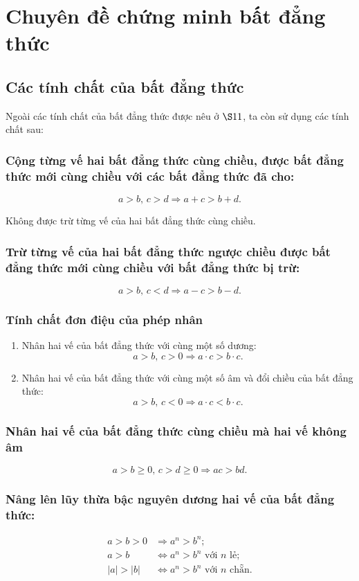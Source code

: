 \section{Chuyên đề chứng minh bất đẳng thức}
\subsection{Các tính chất của bất đẳng thức}
Ngoài các tính chất của bất đẳng thức được nêu ở $\S 11$, ta còn sử dụng các tính chất sau: 
\subsubsection{Cộng từng vế hai bất đẳng thức cùng chiều, được bất đẳng thức mới cùng chiều với các bất đẳng thức đã cho:}
$$a>b,\, c>d\Rightarrow a+c>b+d.$$
\begin{note}
Không được trừ từng vế của hai bất đẳng thức cùng chiều.
\end{note}
\subsubsection{Trừ từng vế của hai bất đẳng thức ngược chiều được bất đẳng thức mới cùng chiều với bất đẳng thức bị trừ:}
$$a>b,\, c<d\Rightarrow a-c>b-d.$$
\subsubsection{Tính chất đơn điệu của phép nhân}
\begin{enumerate}
	\item Nhân hai vế của bất đẳng thức với cùng một số dương:$$a>b,\, c>0\Rightarrow a\cdot c>b\cdot c.$$
	\item Nhân hai vế của bất đẳng thức với cùng một số âm và đổi chiều của bất đẳng thức: $$a>b,\, c<0\Rightarrow a\cdot c<b\cdot c.$$
\end{enumerate}
\subsubsection{Nhân hai vế của bất đẳng thức cùng chiều mà hai vế không âm}
$$a>b\geq 0,\, c>d\geq 0\Rightarrow ac>bd.$$
\subsubsection{Nâng lên lũy thừa bậc nguyên dương hai vế của bất đẳng thức:}
\begin{align*}
a>b>0&\Rightarrow a^n>b^n;\\
a>b&\Leftrightarrow a^n>b^n \text{ với $n$ lẻ};\\
\left|a\right|>\left|b\right|&\Leftrightarrow a^n>b^n \text{ với $n$ chẵn}.
\end{align*}
